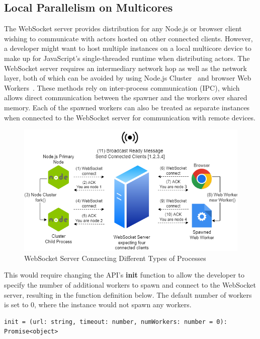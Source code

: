 \documentclass[oneside]{um-fict}
\begin{document}
\subsection{Local Parallelism on Multicores}
The WebSocket server provides distribution for any Node.js or browser client wishing to communicate with actors hosted on other connected clients. However, a developer might want to host multiple instances on a local multicore device to make up for JavaScript's single-threaded runtime when distributing actors. The WebSocket server requires an intermediary network hop as well as the network layer, both of which can be avoided by using Node.js Cluster~\cite{nodejs, cluster} and browser Web Workers~\cite{webworkers}. These methods rely on inter-process communication (IPC), which allows direct communication between the spawner and the workers over shared memory. Each of the spawned workers can also be treated as separate instances when connected to the WebSocket server for communication with remote devices.

\begin{figure}[H]
    \begin{centering}
        \includegraphics[width=\textwidth]{resources/websocketconnectioncomplex.png}
        \caption{WebSocket Server Connecting Different Types of Processes}\label{fig:websocketconnectioncomplex}
    \end{centering}
\end{figure}

This would require changing the API's \textbf{init} function to allow the developer to specify the number of additional workers to spawn and connect to the WebSocket server, resulting in the function definition below. The default number of workers is set to 0, where the instance would not spawn any workers.
\begin{lstlisting}
init = (url: string, timeout: number, numWorkers: number = 0): Promise<object>
\end{lstlisting}
\end{document}
